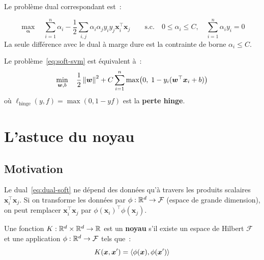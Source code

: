 Le probl\`eme dual correspondant est~:

\begin{formules}[title=\textbf{Probl\`eme dual (marge souple)}]
\begin{equation}
\boxed{
  \max_{\bm{\alpha}} \quad \sum_{i=1}^n \alpha_i
  - \frac{1}{2}\sum_{i,j} \alpha_i \alpha_j y_i y_j \bm{x}_i^\top\bm{x}_j
  \qquad \text{s.c.} \quad 0 \leq \alpha_i \leq C, \quad
  \sum_{i=1}^n \alpha_i y_i = 0
}
\label{eq:dual-soft}
\end{equation}
La seule diff\'erence avec le dual \`a marge dure est la contrainte de borne
$\alpha_i \leq C$.
\end{formules}

\begin{proposition}
Le probl\`eme~\eqref{eq:soft-svm} est \'equivalent \`a~:
\begin{equation}
  \min_{\bm{w}, b} \quad \frac{1}{2}\left\| \bm{w} \right\|^2
  + C \sum_{i=1}^n \max\bigl(0,\; 1 - y_i(\bm{w}^\top\bm{x}_i + b)\bigr)
\end{equation}
o\`u $\ell_{\text{hinge}}(y, f) = \max(0, 1 - yf)$ est la \textbf{perte
hinge}.
\end{proposition}

\section{L'astuce du noyau}
\label{sec:kernel-trick}

\subsection{Motivation}

Le dual~\eqref{eq:dual-soft} ne d\'epend des donn\'ees qu'\`a travers les
produits scalaires $\bm{x}_i^\top\bm{x}_j$. Si on transforme les donn\'ees
par $\phi : \mathbb{R}^d \to \mathcal{F}$ (espace de grande dimension), on peut
remplacer $\bm{x}_i^\top\bm{x}_j$ par
$\phi(\bm{x}_i)^\top\phi(\bm{x}_j)$.

\begin{definition}
Une fonction $K : \mathbb{R}^d \times \mathbb{R}^d \to \mathbb{R}$ est un \textbf{noyau} s'il existe
un espace de Hilbert $\mathcal{F}$ et une application
$\phi : \mathbb{R}^d \to \mathcal{F}$ tels que~:
\begin{equation}
  K(\bm{x}, \bm{x}') = \langle \phi(\bm{x}), \phi(\bm{x}') \rangle
\end{equation}
\end{definition}

